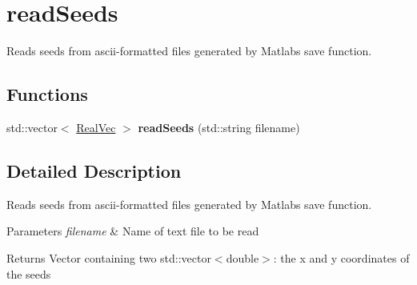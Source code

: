 \hypertarget{group__readSeeds}{}\section{read\+Seeds}
\label{group__readSeeds}


Reads seeds from ascii-\/formatted files generated by Matlab\textquotesingle{}s \textquotesingle{}save\textquotesingle{} function.  


\subsection*{Functions}
\begin{DoxyCompactItemize}
\item 
\mbox{\label{group__readSeeds_gad85b04f26adf16a2034600271b5cbcb3}} 
std\+::vector$<$ \mbox{\hyperlink{aux_8h_ac0a1a538b45426e056715d1f59f854ab}{Real\+Vec}} $>$ {\bfseries read\+Seeds} (std\+::string filename)
\end{DoxyCompactItemize}


\subsection{Detailed Description}
Reads seeds from ascii-\/formatted files generated by Matlab\textquotesingle{}s \textquotesingle{}save\textquotesingle{} function. 


\begin{DoxyParams}{Parameters}
{\em filename} & Name of text file to be read \\
\hline
\end{DoxyParams}
\begin{DoxyReturn}{Returns}
Vector containing two std\+::vector$<$double$>$\+: the x and y coordinates of the seeds 
\end{DoxyReturn}
